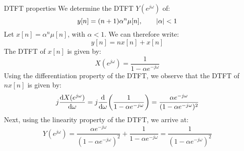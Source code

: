 \documentclass[../../main/main.tex]{subfiles}
\begin{document}

\begin{example}{DTFT properties}{}
    We determine the DTFT \( Y(e^{j\omega}) \) of:
    \begin{equation}
        y[n]
        =
        (n+1) \alpha^{n} \mu[n],
        \qquad
        \abs{\alpha} < 1
        \label{eq:L09_S03_1}
    \end{equation}
    Let \( x[n] = \alpha^{n} \mu[n] \), with \( \alpha < 1 \). We can therefore write:
    \begin{equation}
        y[n]
        =
        nx[n] + x[n]
        \label{eq:L09_S03_2}
    \end{equation}
    The DTFT of \( x[n] \) is given by:
    \begin{equation}
        X(e^{j\omega})
        =
        \frac{1}{1 - \alpha e^{-j\omega}}
        \label{eq:L09_S03_3}
    \end{equation}
    Using the differentiation property of the DTFT, we observe that the DTFT of \( nx[n] \) is given by:
    \begin{equation}
        j \dv{X(e^{j\omega})}{\omega}
        =
        j
        \dv{}{\omega} \qty(\frac{1}{1 - \alpha e^{-j\omega}})
        =
        \frac{\alpha e^{-j\omega}}{(1 - \alpha e^{-j\omega})^2}
        \label{eq:L09_S04_1}
    \end{equation}
    Next, using the linearity property of the DTFT, we arrive at:
    \begin{equation}
        Y(e^{j\omega})
        =
        \frac{\alpha e^{-j\omega}}{(1 - \alpha e^{-j\omega})^2} + \frac{1}{1 - \alpha e^{-j\omega}}
        =
        \frac{1}{(1 - \alpha e^{-j\omega})^2}
        \label{eq:L09_S04_2}
    \end{equation}
\end{example}
\end{document}
